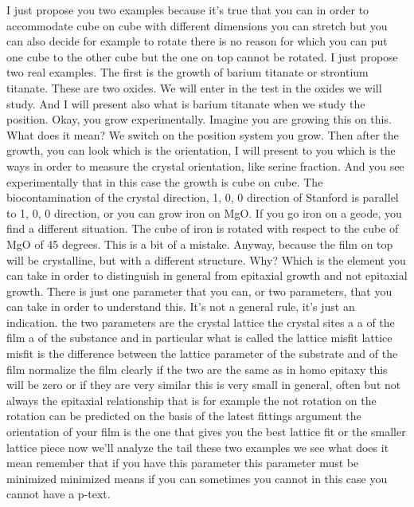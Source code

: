I just propose you two examples because it's true that you can in order to accommodate cube on cube with different dimensions you can stretch but you can also decide for example to rotate there is no reason for which you can put one cube to the other cube but the one on top cannot be rotated. I just propose two real examples. The first is the growth of barium titanate or strontium titanate. These are two oxides. We will enter in the test in the oxides we will study. And I will present also what is barium titanate when we study the position. Okay, you grow experimentally. Imagine you are growing this on this. What does it mean? We switch on the position system you grow. Then after the growth, you can look which is the orientation, I will present to you which is the ways in order to measure the crystal orientation, like serine fraction. And you see experimentally that in this case the growth is cube on cube. The biocontamination of the crystal direction, 1, 0, 0 direction of Stanford is parallel to 1, 0, 0 direction, or you can grow iron on MgO. If you go iron on a geode, you find a different situation. The cube of iron is rotated with respect to the cube of MgO of 45 degrees. This is a bit of a mistake. Anyway, because the film on top will be crystalline, but with a different structure. Why? Which is the element you can take in order to distinguish in general from epitaxial growth and not epitaxial growth. There is just one parameter that you can, or two parameters, that you can take in order to understand this. It's not a general rule, it's just an indication. the two parameters are the crystal lattice the crystal sites a a of the film a of the substance and in particular what is called the lattice misfit lattice misfit is the difference between the lattice parameter of the substrate and of the film normalize the film clearly if the two are the same as in homo epitaxy this will be zero or if they are very similar this is very small in general, often but not always the epitaxial relationship that is for example the not rotation on the rotation can be predicted on the basis of the latest fittings argument the orientation of your film is the one that gives you the best lattice fit or the smaller lattice piece now we'll analyze the tail these two examples we see what does it mean remember that if you have this parameter this parameter must be minimized minimized means if you can sometimes you cannot in this case you cannot have a p-text.
